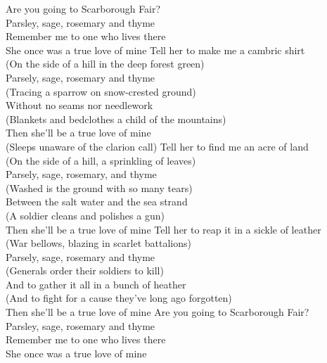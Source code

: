 
Are you going to Scarborough Fair? \\
Parsley, sage, rosemary and thyme \\
Remember me to one who lives there \\
She once was a true love of mine 
\hops
Tell her to make me a cambric shirt\\
 {} (On the side of a hill in the deep forest green)\\
Parsely, sage, rosemary and thyme\\
 {} (Tracing a sparrow on snow-crested ground)\\
Without no seams nor needlework\\
 {} (Blankets and bedclothes a child of the mountains)\\
Then she'll be a true love of mine\\
 {} (Sleeps unaware of the clarion call)
\hops
Tell her to find me an acre of land\\
 {} (On the side of a hill, a sprinkling of leaves)\\
Parsely, sage, rosemary, and thyme\\
 {} (Washed is the ground with so many tears)\\
Between the salt water and the sea strand\\
 {} (A soldier cleans and polishes a gun)\\
Then she'll be a true love of mine
\hops
Tell her to reap it in a sickle of leather\\
 {} (War bellows, blazing in scarlet battalions)\\
Parsely, sage, rosemary and thyme\\
 {} (Generals order their soldiers to kill)\\
And to gather it all in a bunch of heather\\
 {} (And to fight for a cause they've long ago forgotten)\\
Then she'll be a true love of mine
\hops
Are you going to Scarborough Fair?\\
Parsley, sage, rosemary and thyme\\
Remember me to one who lives there\\
She once was a true love of mine 

